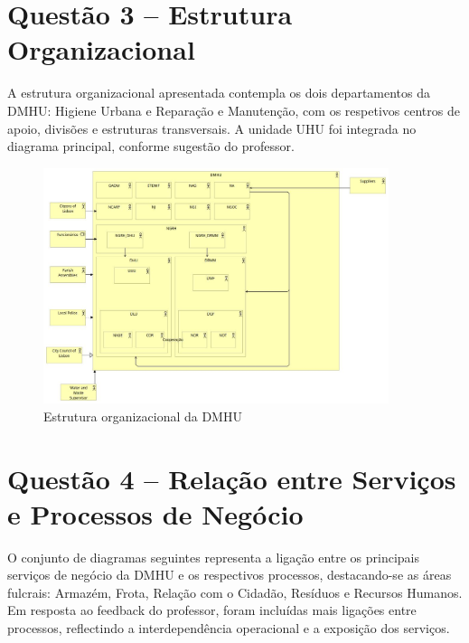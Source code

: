 \documentclass[12pt,a4paper,final]{article}
\begin{document}
    \section*{Questão 3 – Estrutura Organizacional}

    A estrutura organizacional apresentada contempla os dois departamentos da DMHU: Higiene Urbana e Reparação e Manutenção, com os respetivos centros de apoio, divisões e estruturas transversais. A unidade UHU foi integrada no diagrama principal, conforme sugestão do professor.

    \begin{figure}[H]
        \centering
        \includegraphics[width=0.9\textwidth]{Q3 - Business Cooperation.jpg}
        \caption{Estrutura organizacional da DMHU}
        \label{fig:q3-organizacao}
    \end{figure}

    \section*{Questão 4 – Relação entre Serviços e Processos de Negócio}

    O conjunto de diagramas seguintes representa a ligação entre os principais serviços de negócio da DMHU e os respectivos processos, destacando-se as áreas fulcrais: Armazém, Frota, Relação com o Cidadão, Resíduos e Recursos Humanos. Em resposta ao feedback do professor, foram incluídas mais ligações entre processos, reflectindo a interdependência operacional e a exposição dos serviços.
\end{document}
